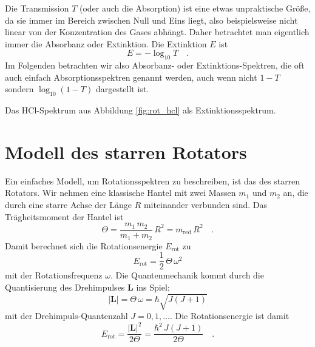 Die Transmission $T$ (oder auch die Absorption) ist eine etwas unpraktische Größe, da sie immer im Bereich zwischen Null und Eins liegt, also beispielsweise nicht linear von der Konzentration des Gases abhängt. Daher betrachtet man eigentlich immer die Absorbanz oder Extinktion. Die Extinktion $E$ ist
%
\begin{equation}
 E = - \log_{10} T \quad .
\end{equation}
%
Im Folgenden betrachten wir also Absorbanz- oder Extinktions-Spektren, die oft auch einfach Absorptionsspektren genannt werden, auch wenn nicht $1-T$ sondern $\log_{10} ( 1- T)$ dargestellt ist.

\begin{marginfigure}
\caption{Das HCl-Spektrum aus Abbildung \ref{fig:rot_hcl} als Extinktionsspektrum.}
\end{marginfigure}




\section{Modell des starren Rotators}

Ein einfaches Modell, um Rotationsspektren zu beschreiben, ist das des starren Rotators. Wir nehmen eine klassische Hantel mit zwei Massen $m_1$ und $m_2$ an, die durch eine starre Achse der Länge $R$ miteinander verbunden sind. Das Trägheitsmoment der Hantel ist
\begin{equation}
 \Theta = \frac{m_1 \, m_2}{m_1 + m_2} \, R^2 = m_\text{red} \, R^2 \quad .
\end{equation}
Damit berechnet sich die Rotationsenergie $E_\text{rot}$ zu
\begin{equation}
 E_\text{rot} = \frac{1}{2} \, \Theta \, \omega^2
\end{equation}
mit der Rotationsfrequenz $\omega$. Die Quantenmechanik kommt durch die Quantisierung des Drehimpulses $\mathbf{L} $ ins Spiel:
\begin{equation}
 | \mathbf{L} | = \Theta \, \omega = \hbar \sqrt{J (J + 1)}
\end{equation}
mit der Drehimpuls-Quantenzahl $J = 0, 1, \dots$. Die Rotationsenergie ist damit
\begin{equation}
 E_\text{rot} = \frac{ | \mathbf{L} |^2}{2 \Theta} = \frac{\hbar^2 \, J (J+1)}{2 \Theta} \quad .
\end{equation}

